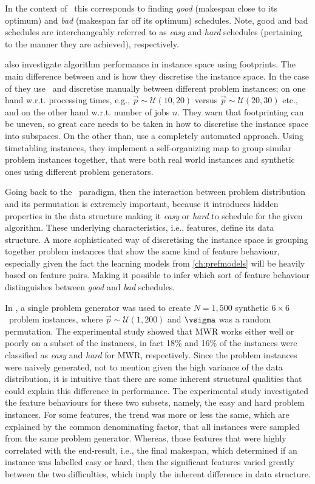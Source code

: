 In the context of \jsp\ this corresponds to finding \emph{good} (makespan close to its optimum)  and \emph{bad} (makespan far off its optimum) schedules. Note, good and bad schedules are interchangeably referred to as \emph{easy} and \emph{hard} schedules (pertaining to the manner they are achieved), respectively. 

\citet{SmithMilesLion5} also investigate algorithm performance in instance space using footprints. The main difference between \citeauthor{Corne10} and \citeauthor{SmithMilesLion5} is how they discretise the instance space. In the case of \citeauthor{Corne10} they use \jsp\ and discretise manually between different problem instances; on one hand w.r.t. processing times, e.g.,  $\vec{p}\sim \mathcal{U}(10,20)$ versus $\vec{p}\sim \mathcal{U}(20,30)$ etc., and on the other hand w.r.t. number of jobs $n$. 
They warn that footprinting can be uneven, so great care needs to be taken in how to discretise the instance space into subspaces. 
On the other than, \citeauthor{SmithMilesLion5} use a completely automated approach. Using timetabling instances, they implement a self-organizing map to group similar problem instances together, that were both real world instances and synthetic ones using different problem generators. 

Going back to the \jsp\ paradigm, then the interaction between problem distribution and its permutation is extremely important, because it introduces hidden properties in the data structure making it \emph{easy} or \emph{hard} to schedule for the given algorithm. These underlying characteristics, i.e., features, define its data structure. A more sophisticated way of discretising the instance space is grouping together problem instances that show the same kind of feature behaviour, especially given the fact the learning models from \cref{ch:prefmodels} will be heavily based on feature pairs. Making it possible to infer which sort of feature behaviour distinguishes  between \emph{good} and \emph{bad} schedules. 

In \citet{InRu12}, a single problem generator was used to create  $N=1,500$ synthetic $6\times6$ \jsp\ problem instances, where $\vec{p}\sim\mathcal{U}(1,200)$ and $\vsigma$ was a random permutation. The experimental study showed that MWR works either well or poorly on a subset of the instances, in fact 18\% and 16\% of the instances were classified as \emph{easy} and \emph{hard} for MWR, respectively. 
Since the problem instances were naively generated, not to mention given the high variance of the data distribution, it is intuitive that there are some inherent structural qualities that could explain this difference in performance. The experimental study investigated the feature behaviours for these two subsets, namely, the easy and hard problem instances. For some features, the trend was more or less the same, which are explained by the common denominating factor, that all instances were sampled from the same problem generator. Whereas, those features that were highly correlated with the end-result, i.e., the final makespan, which determined if an instance was labelled easy or hard, then the significant features varied greatly between the two difficulties, which imply the inherent difference in data structure. 

